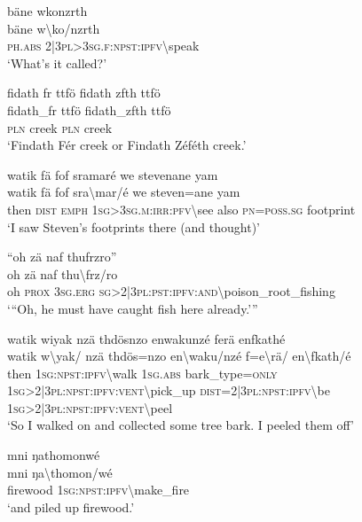 \ea\label{ex:13:a1369}
bäne wkonzrth\\
\gll bäne	w{\textbackslash}ko/nzrth\\
     \textsc{ph}.\textsc{abs}	2|3\textsc{pl}>3\textsc{sg}.\textsc{f}:\textsc{npst}:\textsc{ipfv}{\textbackslash}speak\\
\glt `What's it called?'
\z

\ea\label{ex:13:a1370}
fidath fr ttfö fidath zfth ttfö\\
\gll fidath\_fr	ttfö	fidath\_zfth	ttfö\\
     \textsc{pln}	creek	\textsc{pln}	creek\\
\glt `Findath Fér creek or Findath Zéféth creek.'
\z

\ea\label{ex:13:a1372}
watik fä fof sramaré we stevenane yam\\
\gll watik	fä	fof	sra{\textbackslash}mar/é	we	steven=ane	yam\\
     then	\textsc{dist}	\textsc{emph}	1\textsc{sg}>3\textsc{sg}.\textsc{m}:\textsc{irr}:\textsc{pfv}{\textbackslash}see	also	\textsc{pn}=\textsc{poss}.\textsc{sg}	footprint\\
\glt `I saw Steven's footprints there (and thought)'
\z

\ea\label{ex:13:a1374}
``oh zä naf thufrzro''\\
\gll oh	zä	naf	thu{\textbackslash}frz/ro\\
     oh	\textsc{prox}	3\textsc{sg}.\textsc{erg}	\textsc{sg}>2|3\textsc{pl}:\textsc{pst}:\textsc{ipfv}:\textsc{and}{\textbackslash}poison\_root\_fishing\\
\glt `{``}Oh, he must have caught fish here already.'''
\z

\ea\label{ex:13:a1375}
watik wiyak nzä thdösnzo enwakunzé ferä enfkathé\\
\gll watik	w{\textbackslash}yak/	nzä	thdös=nzo	en{\textbackslash}waku/nzé	f=e{\textbackslash}rä/	en{\textbackslash}fkath/é\\
     then	1\textsc{sg}:\textsc{npst}:\textsc{ipfv}{\textbackslash}walk	1\textsc{sg}.\textsc{abs}	bark\_type=\textsc{only}	1\textsc{sg}>2|3\textsc{pl}:\textsc{npst}:\textsc{ipfv}:\textsc{vent}{\textbackslash}pick\_up	\textsc{dist}=2|3\textsc{pl}:\textsc{npst}:\textsc{ipfv}{\textbackslash}be	1\textsc{sg}>2|3\textsc{pl}:\textsc{npst}:\textsc{ipfv}:\textsc{vent}{\textbackslash}peel\\
\glt `So I walked on and collected some tree bark. I peeled them off'
\z

\ea\label{ex:13:a1376}
mni ŋathomonwé\\
\gll mni	ŋa{\textbackslash}thomon/wé\\
     firewood	1\textsc{sg}:\textsc{npst}:\textsc{ipfv}{\textbackslash}make\_fire\\
\glt `and piled up firewood.'
\z

